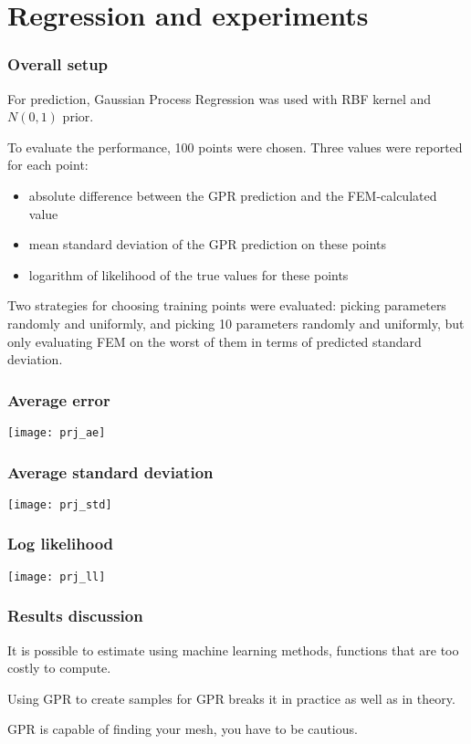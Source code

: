 \documentclass{beamer}
\begin{document}
\section{Regression and experiments}

\frame
{
   \frametitle{Overall setup}
   For prediction, Gaussian Process Regression was used with RBF kernel and $N(0,1)$ prior.
   
   To evaluate the performance, 100 points were chosen. Three values were reported for each point:
   \begin{itemize}
   \item absolute difference between the GPR prediction and the FEM-calculated value
   \item mean standard deviation of the GPR prediction on these points
   \item logarithm of likelihood of the true values for these points
   \end{itemize}
   
   Two strategies for choosing training points were evaluated: picking parameters randomly and uniformly, and picking 10 parameters randomly and uniformly, but only evaluating FEM on the worst of them in terms of predicted standard deviation.
}

\frame
{
  \frametitle{Average error}
  \texttt{[image: prj\_ae]}
  }
\frame
{
  \frametitle{Average standard deviation}
  \texttt{[image: prj\_std]}
  }
\frame
{
  \frametitle{Log likelihood}
  \texttt{[image: prj\_ll]}
  }

\frame
{
\frametitle{Results discussion}
It is possible to estimate using machine learning methods, functions that are too costly to compute.

Using GPR to create samples for GPR breaks it in practice as well as in theory.

GPR is capable of finding your mesh, you have to be cautious.

}
\end{document}
